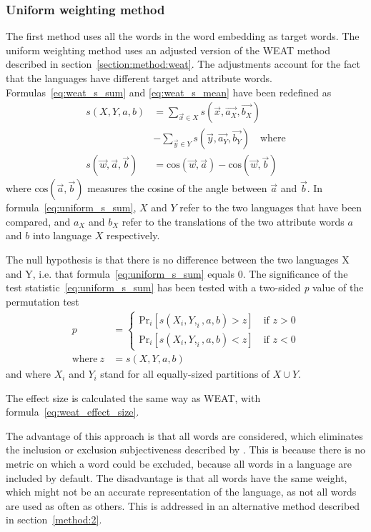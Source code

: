 \subsubsection{Uniform weighting method}
\label{method:1}
The first method uses all the words in the word embedding as target words. 
The uniform weighting method uses an adjusted version of the WEAT method described in
section~\ref{section:method:weat}. The adjustments account for the fact that
the languages have different target and attribute words. Formulas~\eqref{eq:weat_s_sum} and
\eqref{eq:weat_s_mean} have been redefined as 
\begin{align} \label{eq:uniform_s_sum}
    s(X,Y,a,b) &= \displaystyle\sum_{\vec{x} \in X} s(\vec{x},\vec{a_X},\vec{b_X})
    \nonumber \\
               &- \displaystyle\sum_{\vec{y} \in Y} s(\vec{y},\vec{a_Y},\vec{b_Y})
    \quad\text{where}\\
\label{eq:uniform_s_mean}
    s(\vec{w},\vec{a},\vec{b}) &= \text{cos}(\vec{w}, \vec{a}) - \text{cos}(\vec{w}, \vec{b})
\end{align}
where $\text{cos}(\vec{a}, \vec{b})$ measures the cosine of the angle between
$\vec{a}$ and $\vec{b}$. 
In formula~\eqref{eq:uniform_s_sum}, $X$ and $Y$ refer to the two languages that have
been compared, and $a_X$ and $b_X$ refer to the translations of the
two attribute words $a$ and $b$ into language $X$ respectively. 

The null hypothesis is that there is no difference between the two languages X and Y,
i.e. that formula~\eqref{eq:uniform_s_sum} equals 0. The significance of the
test statistic~\eqref{eq:uniform_s_sum} has been tested with a two-sided \emph{p} value
of the permutation test
\begin{align}
    p &= \begin{cases}
    \text{Pr}_i[s(X_i, Y,_i, a, b) > z] \quad \text{if } z > 0 \\
    \text{Pr}_i[s(X_i, Y,_i, a, b) < z] \quad \text{if } z < 0
\end{cases}\nonumber \\
\text{where} \ z &= s(X,Y,a,b)
\end{align}
and where $X_i$ and $Y_i$ stand for all equally-sized partitions of $X \cup Y$.

The effect size is calculated the same way as WEAT, with
formula~\eqref{eq:weat_effect_size}.

The advantage of this approach is
that all words are considered, which eliminates the inclusion or exclusion subjectiveness
described by \textcite{nissim_fair_is_better_2020}.  This is because there is no metric
on which a word could be excluded, because all words in a language are included by default.
The disadvantage is that all words have the same weight, which might not be an accurate
representation of the language, as not all words are used as often as others. This is
addressed in an alternative method described in section~\ref{method:2}.

